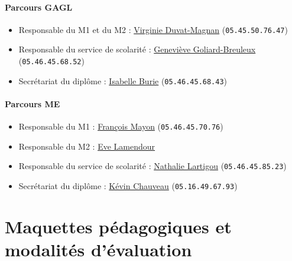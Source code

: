 \documentclass[a4paper,11pt]{article}
\begin{document}
\paragraph{Parcours GAGL}

\begin{itemize}
	\item Responsable du M1 et du M2 : \href{mailto:virginie.magnan@univ-lr.fr}{Virginie Duvat-Magnan} (\texttt{05.45.50.76.47})
	\item Responsable du service de scolarité : \href{mailto:genevieve.breuleux@univ-lr.fr}{Geneviève Goliard-Breuleux} (\texttt{05.46.45.68.52})
	\item Secrétariat du diplôme : \href{mailto:isabelle.burie@univ-lr.fr}{Isabelle Burie} (\texttt{05.46.45.68.43})
\end{itemize}

\paragraph{Parcours ME}

\begin{itemize}
	\item Responsable du M1 : \href{mailto:francois.mayon@univ-lr.fr}{François Mayon} (\texttt{05.46.45.70.76})
	\item Responsable du M2 : \href{mailto:eve.lamendour@univ-lr.fr}{Eve Lamendour}
	\item Responsable du service de scolarité : \href{mailto:nathalie.lartigou}{Nathalie Lartigou} (\texttt{05.46.45.85.23})
	\item Secrétariat du diplôme : \href{mailto:kevin.chauveau}{Kévin Chauveau} (\texttt{05.16.49.67.93})
\end{itemize}

\newpage

\section{Maquettes pédagogiques et modalités d'évaluation}\label{Maquette}
\end{document}
